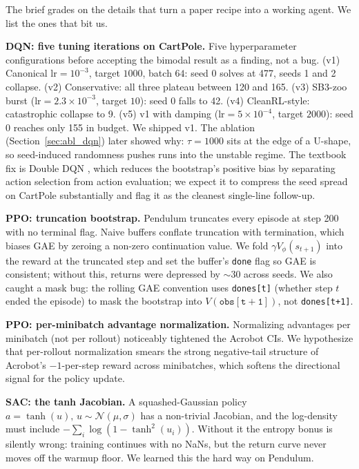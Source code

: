 \documentclass[10pt,a4paper]{article}
\begin{document}
The brief grades on the details that turn a paper recipe into a working agent. We list the ones that bit us.

\textbf{DQN: five tuning iterations on CartPole.} Five hyperparameter configurations before accepting the bimodal result as a finding, not a bug. (v1) Canonical $\mathrm{lr}{=}10^{-3}$, target $1000$, batch $64$: seed 0 solves at 477, seeds 1 and 2 collapse. (v2) Conservative: all three plateau between 120 and 165. (v3) SB3-zoo burst ($\mathrm{lr}{=}2.3\!\times\!10^{-3}$, target $10$): seed 0 falls to 42. (v4) CleanRL-style: catastrophic collapse to 9. (v5) v1 with damping ($\mathrm{lr}{=}5\!\times\!10^{-4}$, target $2000$): seed 0 reaches only 155 in budget. We shipped v1. The ablation (Section~\ref{sec:abl_dqn}) later showed why: $\tau{=}1000$ sits at the edge of a U-shape, so seed-induced randomness pushes runs into the unstable regime. The textbook fix is Double DQN \cite{vanhasselt2016double}, which reduces the bootstrap's positive bias by separating action selection from action evaluation; we expect it to compress the seed spread on CartPole substantially and flag it as the cleanest single-line follow-up.

\textbf{PPO: truncation bootstrap.} Pendulum truncates every episode at step 200 with no terminal flag. Naive buffers conflate truncation with termination, which biases GAE by zeroing a non-zero continuation value. We fold $\gamma V_\phi(s_{t+1})$ into the reward at the truncated step and set the buffer's \texttt{done} flag so GAE is consistent; without this, returns were depressed by $\sim 30$ across seeds. We also caught a mask bug: the rolling GAE convention uses \texttt{dones[t]} (whether step $t$ ended the episode) to mask the bootstrap into $V(\mathtt{obs[t+1]})$, not \texttt{dones[t+1]}.

\textbf{PPO: per-minibatch advantage normalization.} Normalizing advantages per minibatch (not per rollout) noticeably tightened the Acrobot CIs. We hypothesize that per-rollout normalization smears the strong negative-tail structure of Acrobot's $-1$-per-step reward across minibatches, which softens the directional signal for the policy update.

\textbf{SAC: the tanh Jacobian.} A squashed-Gaussian policy $a = \tanh(u),\, u \sim \mathcal{N}(\mu, \sigma)$ has a non-trivial Jacobian, and the log-density must include $-\sum_i \log(1 - \tanh^{2}(u_i))$. Without it the entropy bonus is silently wrong: training continues with no NaNs, but the return curve never moves off the warmup floor. We learned this the hard way on Pendulum.
\end{document}
